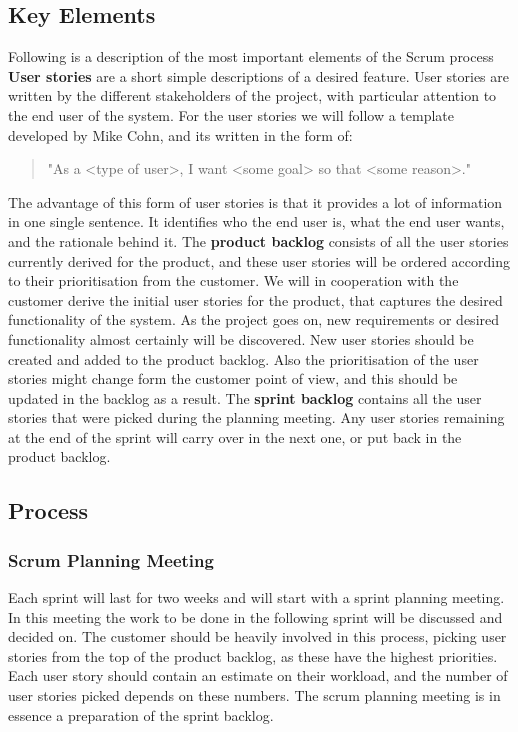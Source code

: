 \subsection{Key Elements}
Following is a description of the most important elements of the Scrum process
\newline
\newline
{\bf User stories} are a short simple descriptions of a desired feature. User stories are written by the different stakeholders of the project, with particular attention to the end user of the system. For the user stories we will follow a template developed by Mike Cohn, and its written in the form of: \begin{quote} "As a <type of user>, I want <some goal> so that <some reason>." \end{quote} The advantage of this form of user stories is that it provides a lot of information in one single sentence. It identifies who the end user is, what the end user wants, and the rationale behind it. 
\newline
\newline
The {\bf product backlog} consists of all the user stories currently derived for the product, and these user stories will be ordered according to their prioritisation from the customer. We will in cooperation with the customer derive the initial user stories for the product, that captures the desired functionality of the system. As the project goes on, new requirements or desired functionality almost certainly will be discovered. New user stories should be created and added to the product backlog. Also the prioritisation of the user stories might change form the customer point of view, and this should be updated in the backlog as a result. The {\bf sprint backlog} contains all the user stories that were picked during the planning meeting. Any user stories remaining at the end of the sprint will carry over in the next one, or put back in the product backlog.

\subsection{Process}

\subsubsection{Scrum Planning Meeting}
Each sprint will last for two weeks and will start with a sprint planning meeting. In this meeting the work to be done in the following sprint will be discussed and decided on. The customer should be heavily involved in this process, picking user stories from the top of the product backlog, as these have the highest priorities. Each user story should contain an estimate on their workload, and the number of user stories picked depends on these numbers. The scrum planning meeting is in essence a preparation of the sprint backlog.

